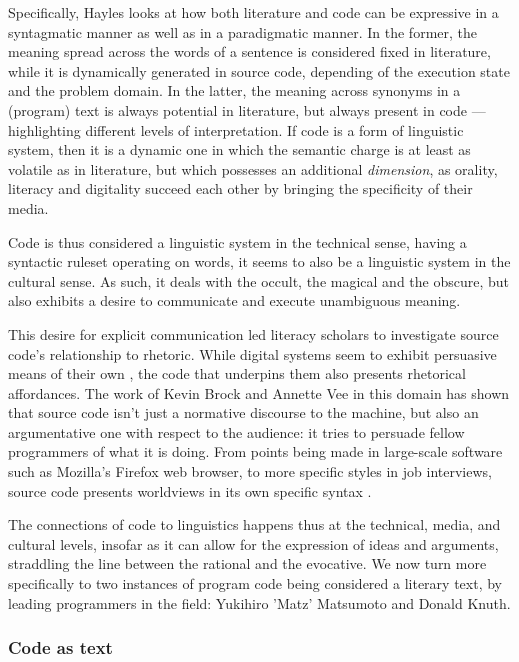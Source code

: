 Specifically, Hayles looks at how both literature and code can be expressive in a syntagmatic manner as well as in a paradigmatic manner. In the former, the meaning spread across the words of a sentence is considered fixed in literature, while it is dynamically generated in source code, depending of the execution state and the problem domain. In the latter, the meaning across synonyms in a (program) text is always potential in literature, but always present in code \citep{hayles_print_2004}—highlighting different levels of interpretation. If code is a form of linguistic system, then it is a dynamic one in which the semantic charge is at least as volatile as in literature, but which possesses an additional \emph{dimension}, as orality, literacy and digitality succeed each other by bringing the specificity of their media.

Code is thus considered a linguistic system in the technical sense, having a syntactic ruleset operating on words, it seems to also be a linguistic system in the cultural sense. As such, it deals with the occult, the magical and the obscure, but also exhibits a desire to communicate and execute unambiguous meaning.

This desire for explicit communication led literacy scholars to investigate source code's relationship to rhetoric. While digital systems seem to exhibit persuasive means of their own \citep{bogost_rhetoric_2008} \citep{frasca_simulation_2013}, the code that underpins them also presents rhetorical affordances. The work of Kevin Brock and Annette Vee in this domain has shown that source code isn't just a normative discourse to the machine, but also an argumentative one with respect to the audience: it tries to persuade fellow programmers of what it is doing. From points being made in large-scale software such as Mozilla's Firefox web browser, to more specific styles in job interviews, source code presents worldviews in its own specific syntax \citep{brock_rhetorical_2019}.

The connections of code to linguistics happens thus at the technical, media, and cultural levels, insofar as it can allow for the expression of ideas and arguments, straddling the line between the rational and the evocative. We now turn more specifically to two instances of program code being considered a literary text, by leading programmers in the field: Yukihiro 'Matz' Matsumoto and Donald Knuth.

\subsubsection{Code as text}
\label{subsubsec:code-text}

